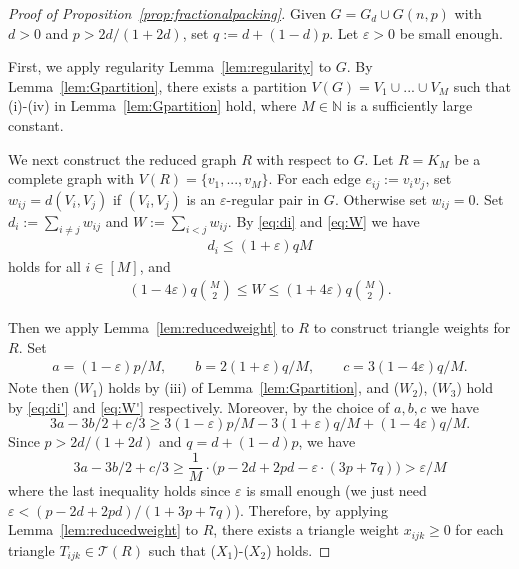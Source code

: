 \documentclass[10pt,a4paper]{amsart}
\newcommand\dT{\mathcal{T}}
\renewcommand\geq{\geqslant}
\renewcommand\le{\leqslant}
\renewcommand\leq{\leqslant}
\begin{document}
\begin{proof}[Proof of Proposition~\ref{prop:fractionalpacking}]
Given $G=G_d\cup G(n,p)$ with $d>0$ and $p>2d/(1+2d)$, set $q:=d+(1-d)p$. Let $\varepsilon>0$ be small enough. 

First, we apply regularity Lemma~\ref{lem:regularity} to $G$. By Lemma~\ref{lem:Gpartition}, there exists a partition $V(G)=V_1\cup...\cup V_M$ such that (i)-(iv) in Lemma~\ref{lem:Gpartition} hold, where $M\in\mathbb{N}$ is a sufficiently large constant. 

We next construct the reduced graph $R$ with respect to $G$. Let $R=K_M$ be a complete graph with $V(R)=\{v_1,...,v_M\}$. For each edge $e_{ij}:=v_iv_j$, set
$w_{ij}= d(V_i,V_j)$ if $(V_i,V_j)$ is an $\varepsilon$-regular pair in $G$. Otherwise set $w_{ij}=0$. Set $d_i:=\sum_{i\neq j}w_{ij}$ and $ W:=\sum_{i<j} w_{ij}$. By \eqref{eq:di} and \eqref{eq:W} we have
\begin{align}\label{eq:di'}
d_i\leq (1+\varepsilon)qM
\end{align}
holds for all $i\in [M]$, and
\begin{align}\label{eq:W'}
(1-4\varepsilon)q\binom{M}{2}\le W\le
(1+4\varepsilon)q\binom{M}{2}.   
\end{align}

Then we apply Lemma~\ref{lem:reducedweight} to $R$ to construct triangle weights for $R$. Set 
\begin{align*}
a=(1-\varepsilon)p/M,\qquad b=2(1+\varepsilon)q/M,\qquad c=3(1-4\varepsilon)q/M.   
\end{align*}
Note then ($W_1$) holds by (iii) of Lemma~\ref{lem:Gpartition}, and ($W_2$), ($W_3$) hold by \eqref{eq:di'} and \eqref{eq:W'} respectively. Moreover, by the choice of $a,b,c$ we have 
$$3a-3b/2+c/3\geq 3(1-\varepsilon)p/M - 3(1+\varepsilon)q/M + (1-4\varepsilon)q/M.$$
Since $p>2d/(1+2d)$ and $q=d+(1-d)p$, we have
$$3a-3b/2+c/3\geq \frac{1}{M}\cdot \Big(p-2d+2pd-\varepsilon\cdot(3p+7q)\Big)>\varepsilon/M$$
where the last inequality holds since $\varepsilon$ is small enough (we just need $\varepsilon<(p-2d+2pd)/(1+3p+7q)$). Therefore, by applying Lemma~\ref{lem:reducedweight} to $R$, there exists a triangle weight $x_{ijk}\geq 0$ for each triangle $T_{ijk}\in\dT(R)$ such that ($X_1$)-($X_2$) holds.  


\end{proof}
\end{document}

